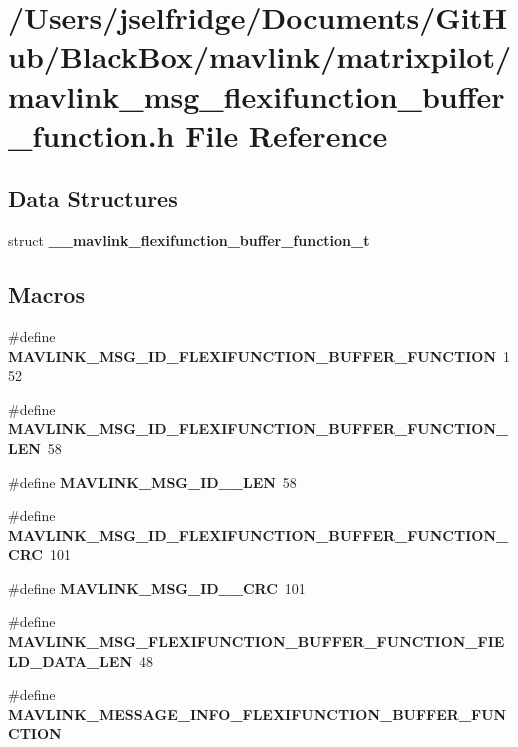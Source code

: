 \section{/\+Users/jselfridge/\+Documents/\+Git\+Hub/\+Black\+Box/mavlink/matrixpilot/mavlink\+\_\+msg\+\_\+flexifunction\+\_\+buffer\+\_\+function.h File Reference}
\label{mavlink__msg__flexifunction__buffer__function_8h}
\subsection*{Data Structures}
\begin{DoxyCompactItemize}
\item 
struct \textbf{ \+\_\+\+\_\+mavlink\+\_\+flexifunction\+\_\+buffer\+\_\+function\+\_\+t}
\end{DoxyCompactItemize}
\subsection*{Macros}
\begin{DoxyCompactItemize}
\item 
\#define \textbf{ M\+A\+V\+L\+I\+N\+K\+\_\+\+M\+S\+G\+\_\+\+I\+D\+\_\+\+F\+L\+E\+X\+I\+F\+U\+N\+C\+T\+I\+O\+N\+\_\+\+B\+U\+F\+F\+E\+R\+\_\+\+F\+U\+N\+C\+T\+I\+ON}~152
\item 
\#define \textbf{ M\+A\+V\+L\+I\+N\+K\+\_\+\+M\+S\+G\+\_\+\+I\+D\+\_\+\+F\+L\+E\+X\+I\+F\+U\+N\+C\+T\+I\+O\+N\+\_\+\+B\+U\+F\+F\+E\+R\+\_\+\+F\+U\+N\+C\+T\+I\+O\+N\+\_\+\+L\+EN}~58
\item 
\#define \textbf{ M\+A\+V\+L\+I\+N\+K\+\_\+\+M\+S\+G\+\_\+\+I\+D\+\_\+\_\+\+L\+EN}~58
\item 
\#define \textbf{ M\+A\+V\+L\+I\+N\+K\+\_\+\+M\+S\+G\+\_\+\+I\+D\+\_\+\+F\+L\+E\+X\+I\+F\+U\+N\+C\+T\+I\+O\+N\+\_\+\+B\+U\+F\+F\+E\+R\+\_\+\+F\+U\+N\+C\+T\+I\+O\+N\+\_\+\+C\+RC}~101
\item 
\#define \textbf{ M\+A\+V\+L\+I\+N\+K\+\_\+\+M\+S\+G\+\_\+\+I\+D\+\_\+\_\+\+C\+RC}~101
\item 
\#define \textbf{ M\+A\+V\+L\+I\+N\+K\+\_\+\+M\+S\+G\+\_\+\+F\+L\+E\+X\+I\+F\+U\+N\+C\+T\+I\+O\+N\+\_\+\+B\+U\+F\+F\+E\+R\+\_\+\+F\+U\+N\+C\+T\+I\+O\+N\+\_\+\+F\+I\+E\+L\+D\+\_\+\+D\+A\+T\+A\+\_\+\+L\+EN}~48
\item 
\#define \textbf{ M\+A\+V\+L\+I\+N\+K\+\_\+\+M\+E\+S\+S\+A\+G\+E\+\_\+\+I\+N\+F\+O\+\_\+\+F\+L\+E\+X\+I\+F\+U\+N\+C\+T\+I\+O\+N\+\_\+\+B\+U\+F\+F\+E\+R\+\_\+\+F\+U\+N\+C\+T\+I\+ON}
\end{DoxyCompactItemize}
